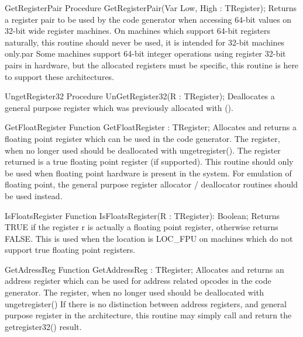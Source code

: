 \documentclass [a4paper,12pt]{article}
\begin{document}
\begin{procedure}{GetRegisterPair}
\Declaration
Procedure GetRegisterPair(Var Low, High : TRegister);
\Description
Returns a register pair to be used by the code generator when accessing
64-bit values on 32-bit wide register machines.
\Notes
On machines which support 64-bit registers naturally, this routine should
never be used, it is intended for 32-bit machines only.par Some machines
support 64-bit integer operations using register 32-bit pairs in hardware,
but the allocated registers must be specific, this routine is here to
support these architectures.
\end{procedure}

\begin{procedure}{UngetRegister32}
\Declaration
Procedure UnGetRegister32(R : TRegister);
\Description
Deallocates a general purpose register which was previously allocated with
().
\end{procedure}

\begin{function}{GetFloatRegister}
\Declaration
Function GetFloatRegister : TRegister;
\Description
Allocates and returns a floating point register which can be used in the
code generator. The register, when no longer used should be deallocated with
ungetregister(). The register returned is a true floating point register (if
supported).
\Notes
This routine should only be used when floating point hardware is present in
the system. For emulation of floating point, the general purpose register
allocator / deallocator routines should be used instead.
\end{function}

\begin{function}{IsFloatsRegister}
\Declaration
Function IsFloatsRegister(R : TRegister): Boolean;
\Description
Returns TRUE if the register r is actually a floating point register,
otherwise returns FALSE. This is used when the location is LOC{\_}FPU on
machines which do not support true floating point registers.
\end{function}

\begin{function}{GetAdressReg}
\Declaration
Function GetAddressReg : TRegister;
\Description
Allocates and returns an address register which can be used for address
related opcodes in the code generator. The register, when no longer used
should be deallocated with ungetregister()
\Notes
If there is no distinction between address registers, and general purpose
register in the architecture, this routine may simply call and return the
getregister32() result.
\end{function}
\end{document}
